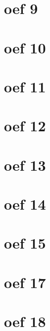 \documentclass[lineaire_algebra_oplossingen.tex]{subfiles}
\begin{document}
\section{oef 9}
\section{oef 10}
\section{oef 11}
\section{oef 12}
\section{oef 13}
\section{oef 14}
\section{oef 15}
\section{oef 17}
\section{oef 18}
\end{document}
